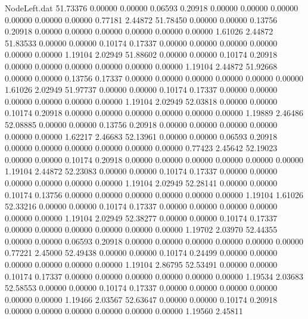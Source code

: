 \begin{filecontents}{NodeLeft.dat}
  51.73376    0.00000    0.00000     0.06593    0.20918    0.00000    0.00000    0.00000    0.00000    0.00000    0.00000    0.77181    2.44872
  51.78450    0.00000    0.00000     0.13756    0.20918    0.00000    0.00000    0.00000    0.00000    0.00000    0.00000    1.61026    2.44872
  51.83533    0.00000    0.00000     0.10174    0.17337    0.00000    0.00000    0.00000    0.00000    0.00000    0.00000    1.19104    2.02949
  51.88602    0.00000    0.00000     0.10174    0.20918    0.00000    0.00000    0.00000    0.00000    0.00000    0.00000    1.19104    2.44872
  51.92668    0.00000    0.00000     0.13756    0.17337    0.00000    0.00000    0.00000    0.00000    0.00000    0.00000    1.61026    2.02949
  51.97737    0.00000    0.00000     0.10174    0.17337    0.00000    0.00000    0.00000    0.00000    0.00000    0.00000    1.19104    2.02949
  52.03818    0.00000    0.00000     0.10174    0.20918    0.00000    0.00000    0.00000    0.00000    0.00000    0.00000    1.19889    2.46486
  52.08885    0.00000    0.00000     0.13756    0.20918    0.00000    0.00000    0.00000    0.00000    0.00000    0.00000    1.62217    2.46683
  52.13961    0.00000    0.00000     0.06593    0.20918    0.00000    0.00000    0.00000    0.00000    0.00000    0.00000    0.77423    2.45642
  52.19023    0.00000    0.00000     0.10174    0.20918    0.00000    0.00000    0.00000    0.00000    0.00000    0.00000    1.19104    2.44872
  52.23083    0.00000    0.00000     0.10174    0.17337    0.00000    0.00000    0.00000    0.00000    0.00000    0.00000    1.19104    2.02949
  52.28141    0.00000    0.00000     0.10174    0.13756    0.00000    0.00000    0.00000    0.00000    0.00000    0.00000    1.19104    1.61026
  52.33216    0.00000    0.00000     0.10174    0.17337    0.00000    0.00000    0.00000    0.00000    0.00000    0.00000    1.19104    2.02949
  52.38277    0.00000    0.00000     0.10174    0.17337    0.00000    0.00000    0.00000    0.00000    0.00000    0.00000    1.19702    2.03970
  52.44355    0.00000    0.00000     0.06593    0.20918    0.00000    0.00000    0.00000    0.00000    0.00000    0.00000    0.77221    2.45000
  52.49438    0.00000    0.00000     0.10174    0.24499    0.00000    0.00000    0.00000    0.00000    0.00000    0.00000    1.19104    2.86795
  52.53491    0.00000    0.00000     0.10174    0.17337    0.00000    0.00000    0.00000    0.00000    0.00000    0.00000    1.19534    2.03683
  52.58553    0.00000    0.00000     0.10174    0.17337    0.00000    0.00000    0.00000    0.00000    0.00000    0.00000    1.19466    2.03567
  52.63647    0.00000    0.00000     0.10174    0.20918    0.00000    0.00000    0.00000    0.00000    0.00000    0.00000    1.19560    2.45811

\end{filecontents}
